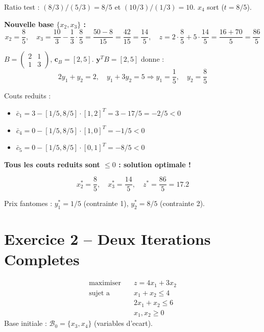 \documentclass[12pt,a4paper]{article}
\begin{document}
\begin{correction}
Ratio test : $(8/3)/(5/3) = 8/5$ et $(10/3)/(1/3) = 10$. $x_4$ sort ($t = 8/5$).

\textbf{Nouvelle base $\{x_2, x_3\}$ :}
$$x_2 = \frac{8}{5},\quad x_3 = \frac{10}{3} - \frac{1}{3}\cdot\frac{8}{5} = \frac{50-8}{15} = \frac{42}{15} = \frac{14}{5}, \quad z = 2\cdot\frac{8}{5} + 5\cdot\frac{14}{5} = \frac{16+70}{5} = \frac{86}{5}$$

$B = \begin{pmatrix}2 & 1\\1 & 3\end{pmatrix}$, $\mathbf{c}_B = [2,5]$. $\mathbf{y}^T B = [2,5]$ donne :
$$2y_1+y_2=2,\quad y_1+3y_2=5 \Rightarrow y_1 = \frac{1}{5},\quad y_2 = \frac{8}{5}$$

Couts reduits :
\begin{itemize}
\item $\bar{c}_1 = 3 - [1/5, 8/5]\cdot[1,2]^T = 3 - 17/5 = -2/5 < 0$
\item $\bar{c}_4 = 0 - [1/5, 8/5]\cdot[1,0]^T = -1/5 < 0$
\item $\bar{c}_5 = 0 - [1/5, 8/5]\cdot[0,1]^T = -8/5 < 0$
\end{itemize}

\textcolor{defvert}{\Large\textbf{Tous les couts reduits sont $\leq 0$ : solution optimale !}}

$$\boxed{x_2^* = \frac{8}{5}, \quad x_3^* = \frac{14}{5}, \quad z^* = \frac{86}{5} = 17.2}$$

Prix fantomes : $y_1^* = 1/5$ (contrainte 1), $y_2^* = 8/5$ (contrainte 2).
\end{correction}

\newpage
\section{Exercice 2 -- Deux Iterations Completes}

\begin{enonce}
\begin{align*}
\text{maximiser} \quad & z = 4x_1 + 3x_2\\
\text{sujet a} \quad & x_1 + x_2 \leq 4\\
& 2x_1 + x_2 \leq 6\\
& x_1, x_2 \geq 0
\end{align*}
Base initiale : $\mathcal{B}_0 = \{x_3, x_4\}$ (variables d'ecart).
\end{enonce}
\end{document}
